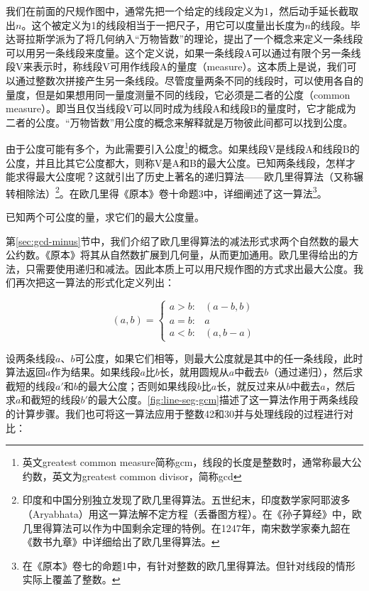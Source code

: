 \documentclass[b5paper]{ctexart}
\begin{document}
我们在前面的尺规作图中，通常先把一个给定的线段定义为1，然后动手延长截取出$n$。这个被定义为1的线段相当于一把尺子，用它可以度量出长度为$n$的线段。毕达哥拉斯学派为了将几何纳入“万物皆数”的理论，提出了一个概念来定义一条线段可以用另一条线段来度量。这个定义说，如果一条线段A可以通过有限个另一条线段V来表示时，称线段V可用作线段A的量度（measure）。这本质上是说，我们可以通过整数次拼接产生另一条线段。尽管度量两条不同的线段时，可以使用各自的量度，但是如果想用同一量度测量不同的线段，它必须是二者的公度（common measure）。即当且仅当线段V可以同时成为线段A和线段B的量度时，它才能成为二者的公度。“万物皆数”用公度的概念来解释就是万物彼此间都可以找到公度。

由于公度可能有多个，为此需要引入公度\footnote{英文greatest common measure简称gcm，线段的长度是整数时，通常称最大公约数，英文为greatest common divisor，简称gcd}的概念。如果线段V是线段A和线段B的公度，并且比其它公度都大，则称V是A和B的最大公度。已知两条线段，怎样才能求得最大公度呢？这就引出了历史上著名的递归算法——欧几里得算法（又称辗转相除法）\footnote{印度和中国分别独立发现了欧几里得算法。五世纪末，印度数学家阿耶波多（Aryabhata）用这一算法解不定方程（丢番图方程）。在《孙子算经》中，欧几里得算法可以作为中国剩余定理的特例。在1247年，南宋数学家秦九韶在《数书九章》中详细给出了欧几里得算法。}。在欧几里得《原本》卷十命题3中\cite{Elements}，详细阐述了这一算法\footnote{在《原本》卷七的命题1中，有针对整数的欧几里得算法。但针对线段的情形实际上覆盖了整数。}。

\begin{proposition}[《原本》，卷十，命题3]
已知两个可公度的量，求它们的最大公度量。
\end{proposition}

第\ref{sec:gcd-minus}节中，我们介绍了欧几里得算法的减法形式求两个自然数的最大公约数。《原本》将其从自然数扩展到几何量，从而更加通用。欧几里得给出的方法，只需要使用递归和减法。因此本质上可以用尺规作图的方式求出最大公度。我们再次把这一算法的形式化定义列出：

\[
(a, b) = \begin{cases}
  a > b :& (a - b, b) \\
  a = b :& a \\
  a < b :& (a, b - a)
  \end{cases}
\]

设两条线段$a$、$b$可公度，如果它们相等，则最大公度就是其中的任一条线段，此时算法返回$a$作为结果。如果线段$a$比$b$长，就用圆规从$a$中截去$b$（通过递归），然后求截短的线段$a'$和$b$的最大公度；否则如果线段$b$比$a$长，就反过来从$b$中截去$a$，然后求$a$和截短的线段$b'$的最大公度。\cref{fig:line-seg-gcm}描述了这一算法作用于两条线段的计算步骤。我们也可将这一算法应用于整数42和30并与处理线段的过程进行对比：
\end{document}
